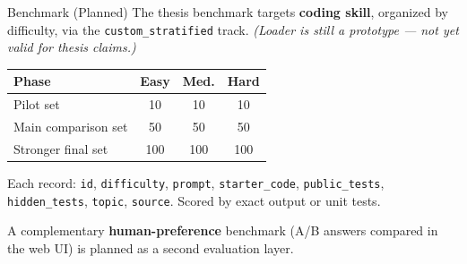 \begin{block}{Benchmark (Planned)}
  The thesis benchmark targets \textbf{coding skill}, organized by difficulty, via the
  \texttt{custom\_stratified} track. \textit{(Loader is still a prototype --- not yet
  valid for thesis claims.)}

  \vspace{4pt}
  \begin{center}
  \begin{tabular}{@{}lccc@{}}
    \toprule
    \textbf{Phase} & \textbf{Easy} & \textbf{Med.} & \textbf{Hard} \\
    \midrule
    Pilot set            & 10  & 10  & 10  \\
    Main comparison set  & 50  & 50  & 50  \\
    Stronger final set   & 100 & 100 & 100 \\
    \bottomrule
  \end{tabular}
  \end{center}

  \vspace{4pt}
  \footnotesize Each record: \texttt{id}, \texttt{difficulty}, \texttt{prompt},
  \texttt{starter\_code}, \texttt{public\_tests}, \texttt{hidden\_tests}, \texttt{topic},
  \texttt{source}. Scored by exact output or unit tests.

  \vspace{6pt}
  \normalsize A complementary \textbf{human-preference} benchmark (A/B answers compared in
  the web UI) is planned as a second evaluation layer.
\end{block}
